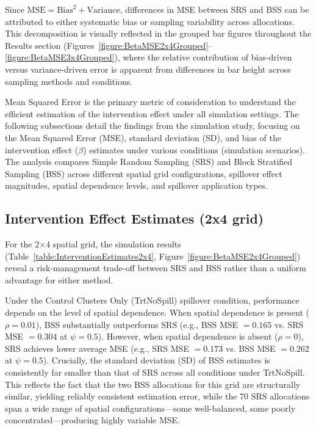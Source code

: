 \documentclass{article}[11pt]
\begin{document}
Since $\text{MSE} = \text{Bias}^2 + \text{Variance}$, differences in MSE between SRS and BSS can be attributed to either systematic bias or sampling variability across allocations. This decomposition is visually reflected in the grouped bar figures throughout the Results section (Figures~\ref{figure:BetaMSE2x4Grouped}--\ref{figure:BetaMSE3x4Grouped}), where the relative contribution of bias-driven versus variance-driven error is apparent from differences in bar height across sampling methods and conditions.

Mean Squared Error is the primary metric of consideration to understand the efficient estimation of the intervention effect under all simulation settings. The following subsections detail the findings from the simulation study, focusing on the Mean Squared Error (MSE), standard deviation (SD), and bias of the intervention effect ($\beta$) estimates under various conditions (simulation scenarios). The analysis compares Simple Random Sampling (SRS) and Block Stratified Sampling (BSS) across different spatial grid configurations, spillover effect magnitudes, spatial dependence levels, and spillover application types.

\subsection{Intervention Effect Estimates (2x4 grid)}

For the 2$\times$4 spatial grid, the simulation results (Table~\ref{table:InterventionEstimates2x4}, Figure~\ref{figure:BetaMSE2x4Grouped}) reveal a risk-management trade-off between SRS and BSS rather than a uniform advantage for either method.

Under the Control Clusters Only (TrtNoSpill) spillover condition, performance depends on the level of spatial dependence. When spatial dependence is present ($\rho = 0.01$), BSS substantially outperforms SRS (e.g., BSS MSE $= 0.165$ vs. SRS MSE $= 0.304$ at $\psi = 0.5$). However, when spatial dependence is absent ($\rho = 0$), SRS achieves lower average MSE (e.g., SRS MSE $= 0.173$ vs. BSS MSE $= 0.262$ at $\psi = 0.5$). Crucially, the standard deviation (SD) of BSS estimates is consistently far smaller than that of SRS across all conditions under TrtNoSpill. This reflects the fact that the two BSS allocations for this grid are structurally similar, yielding reliably consistent estimation error, while the 70 SRS allocations span a wide range of spatial configurations---some well-balanced, some poorly concentrated---producing highly variable MSE.
\end{document}
